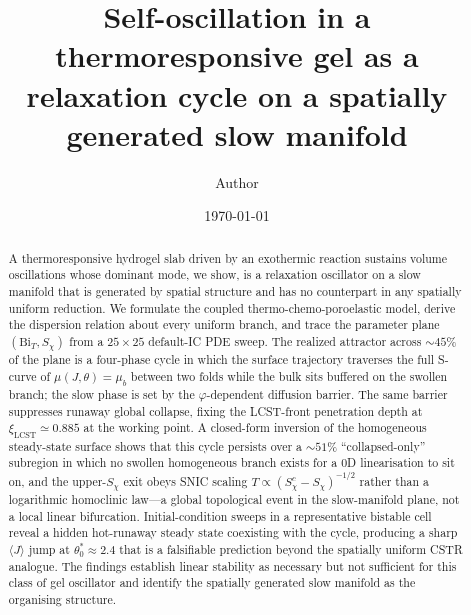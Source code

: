 \documentclass[aps,pre,reprint,superscriptaddress,longbibliography,floatfix]{revtex4-2}
\newcommand{\Bi}{\mathrm{Bi}}
\begin{document}
\title{Self-oscillation in a thermoresponsive gel as a relaxation cycle on a
spatially generated slow manifold}

\author{Author}

\date{\today}

\begin{abstract}
A thermoresponsive hydrogel slab driven by an exothermic reaction
sustains volume oscillations whose dominant mode, we show, is a
relaxation oscillator on a slow manifold that is generated by spatial
structure and has no counterpart in any spatially uniform reduction.
We formulate the coupled thermo-chemo-poroelastic model, derive the
dispersion relation about every uniform branch, and trace the
parameter plane $(\Bi_T,S_\chi)$ from a $25\!\times\!25$ default-IC
PDE sweep. The realized attractor across $\sim\!45\%$ of the plane is
a four-phase cycle in which the surface trajectory traverses the full
S-curve of $\mu(J,\theta)\!=\!\mu_b$ between two folds while the bulk
sits buffered on the swollen branch; the slow phase is set by the
$\varphi$-dependent diffusion barrier. The same barrier suppresses
runaway global collapse, fixing the LCST-front penetration depth at
$\xi_\mathrm{LCST}\!\simeq\!0.885$ at the working point. A closed-form
inversion of the homogeneous steady-state surface shows that this
cycle persists over a $\sim\!51\%$ ``collapsed-only'' subregion in
which no swollen homogeneous branch exists for a 0D linearisation to
sit on, and the upper-$S_\chi$ exit obeys SNIC scaling
$T\!\propto\!(S_\chi^c\!-\!S_\chi)^{-1/2}$ rather than a logarithmic
homoclinic law---a global topological event in the slow-manifold
plane, not a local linear bifurcation. Initial-condition sweeps in a
representative bistable cell reveal a hidden hot-runaway steady state
coexisting with the cycle, producing a sharp $\langle J\rangle$ jump
at $\theta_0^{\!*}\!\approx\!2.4$ that is a falsifiable prediction
beyond the spatially uniform CSTR analogue. The findings establish
linear stability as necessary but not sufficient for this class of
gel oscillator and identify the spatially generated slow manifold as
the organising structure.
\end{abstract}

\maketitle

\end{document}
